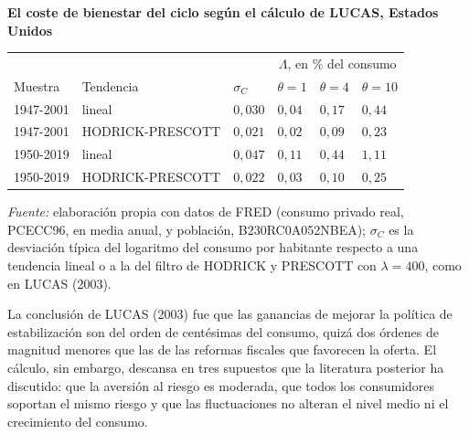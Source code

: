 \documentclass[10pt,a4paper]{article}
\begin{document}
\begin{center}\begin{minipage}{\linewidth}\centering
{\small\textbf{El coste de bienestar del ciclo según el cálculo de LUCAS, Estados Unidos}}\par\vspace{0.4em}
{\footnotesize
\begin{tabular}{p{2.4cm}p{3.4cm}p{1.6cm}p{1.6cm}p{1.6cm}p{1.6cm}}
\hline
 & & & \multicolumn{3}{c}{$\Lambda$, en \% del consumo}\tabularnewline
Muestra & Tendencia & $\sigma_C$ & $\theta=1$ & $\theta=4$ & $\theta=10$\tabularnewline
\hline
1947-2001 & lineal & $0{,}030$ & $0{,}04$ & $0{,}17$ & $0{,}44$\tabularnewline
1947-2001 & HODRICK-PRESCOTT & $0{,}021$ & $0{,}02$ & $0{,}09$ & $0{,}23$\tabularnewline
1950-2019 & lineal & $0{,}047$ & $0{,}11$ & $0{,}44$ & $1{,}11$\tabularnewline
1950-2019 & HODRICK-PRESCOTT & $0{,}022$ & $0{,}03$ & $0{,}10$ & $0{,}25$\tabularnewline
\hline
\end{tabular}}\par\vspace{0.4em}
{\small\textit{Fuente: }elaboración propia con datos de FRED (consumo privado real, PCECC96, en media anual, y población, B230RC0A052NBEA); $\sigma_C$ es la desviación típica del logaritmo del consumo por habitante respecto a una tendencia lineal o a la del filtro de HODRICK y PRESCOTT con $\lambda=400$, como en LUCAS (2003).}
\end{minipage}\end{center}

La conclusión de LUCAS (2003) fue que las ganancias de mejorar la política de estabilización son del orden de centésimas del consumo, quizá dos órdenes de magnitud menores que las de las reformas fiscales que favorecen la oferta. El cálculo, sin embargo, descansa en tres supuestos que la literatura posterior ha discutido: que la aversión al riesgo es moderada, que todos los consumidores soportan el mismo riesgo y que las fluctuaciones no alteran el nivel medio ni el crecimiento del consumo.
\end{document}
